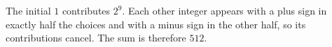 The initial $1$ contributes $2^9$. Each other integer appears with a plus sign in exactly half the choices and with a minus sign in the other half, so its contributions cancel. The sum is therefore $\boxed{512}$.
